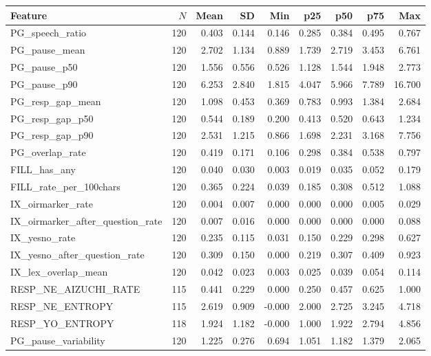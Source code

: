 \begin{tabular}{lrrrrrrrr}
\toprule
Feature & $N$ & Mean & SD & Min & p25 & p50 & p75 & Max \\
\midrule
PG\_speech\_ratio & 120 & 0.403 & 0.144 & 0.146 & 0.285 & 0.384 & 0.495 & 0.767 \\
PG\_pause\_mean & 120 & 2.702 & 1.134 & 0.889 & 1.739 & 2.719 & 3.453 & 6.761 \\
PG\_pause\_p50 & 120 & 1.556 & 0.556 & 0.526 & 1.128 & 1.544 & 1.948 & 2.773 \\
PG\_pause\_p90 & 120 & 6.253 & 2.840 & 1.815 & 4.047 & 5.966 & 7.789 & 16.700 \\
PG\_resp\_gap\_mean & 120 & 1.098 & 0.453 & 0.369 & 0.783 & 0.993 & 1.384 & 2.684 \\
PG\_resp\_gap\_p50 & 120 & 0.544 & 0.189 & 0.200 & 0.413 & 0.520 & 0.643 & 1.234 \\
PG\_resp\_gap\_p90 & 120 & 2.531 & 1.215 & 0.866 & 1.698 & 2.231 & 3.168 & 7.756 \\
PG\_overlap\_rate & 120 & 0.419 & 0.171 & 0.106 & 0.298 & 0.384 & 0.538 & 0.797 \\
FILL\_has\_any & 120 & 0.040 & 0.030 & 0.003 & 0.019 & 0.035 & 0.052 & 0.179 \\
FILL\_rate\_per\_100chars & 120 & 0.365 & 0.224 & 0.039 & 0.185 & 0.308 & 0.512 & 1.088 \\
IX\_oirmarker\_rate & 120 & 0.004 & 0.007 & 0.000 & 0.000 & 0.000 & 0.005 & 0.029 \\
IX\_oirmarker\_after\_question\_rate & 120 & 0.007 & 0.016 & 0.000 & 0.000 & 0.000 & 0.000 & 0.088 \\
IX\_yesno\_rate & 120 & 0.235 & 0.115 & 0.031 & 0.150 & 0.229 & 0.298 & 0.627 \\
IX\_yesno\_after\_question\_rate & 120 & 0.309 & 0.150 & 0.000 & 0.219 & 0.307 & 0.409 & 0.923 \\
IX\_lex\_overlap\_mean & 120 & 0.042 & 0.023 & 0.003 & 0.025 & 0.039 & 0.054 & 0.114 \\
RESP\_NE\_AIZUCHI\_RATE & 115 & 0.441 & 0.229 & 0.000 & 0.250 & 0.457 & 0.625 & 1.000 \\
RESP\_NE\_ENTROPY & 115 & 2.619 & 0.909 & -0.000 & 2.000 & 2.725 & 3.245 & 4.718 \\
RESP\_YO\_ENTROPY & 118 & 1.924 & 1.182 & -0.000 & 1.000 & 1.922 & 2.794 & 4.856 \\
PG\_pause\_variability & 120 & 1.225 & 0.276 & 0.694 & 1.051 & 1.182 & 1.379 & 2.065 \\
\bottomrule
\end{tabular}
